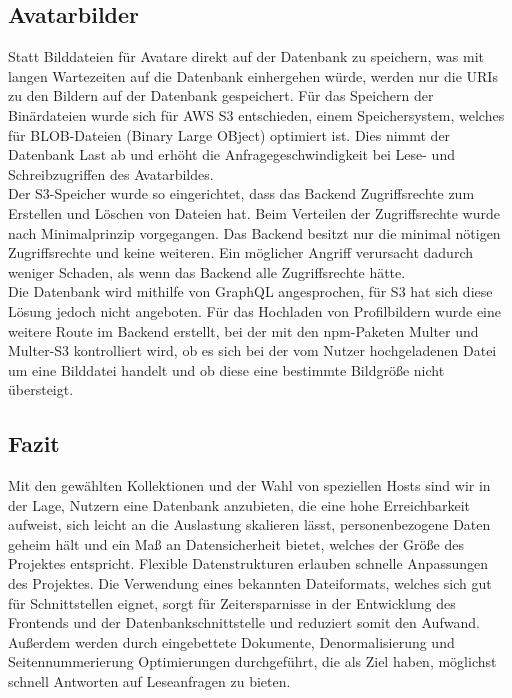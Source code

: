 \subsection{Avatarbilder}
Statt Bilddateien für Avatare direkt auf der Datenbank zu speichern, was mit langen Wartezeiten auf die Datenbank einhergehen würde, werden nur die URIs zu den Bildern auf der Datenbank gespeichert.
Für das Speichern der Binärdateien wurde sich für AWS S3 entschieden, einem Speichersystem, welches für BLOB-Dateien (Binary Large OBject) optimiert ist.
Dies nimmt der Datenbank Last ab und erhöht die Anfragegeschwindigkeit bei Lese- und Schreibzugriffen des Avatarbildes.\\
Der S3-Speicher wurde so eingerichtet, dass das Backend Zugriffsrechte zum Erstellen und Löschen von Dateien hat.
Beim Verteilen der Zugriffsrechte wurde nach Minimalprinzip vorgegangen.
Das Backend besitzt nur die minimal nötigen Zugriffsrechte und keine weiteren.
Ein möglicher Angriff verursacht dadurch weniger Schaden, als wenn das Backend alle Zugriffsrechte hätte.\\
Die Datenbank wird mithilfe von GraphQL angesprochen, für S3 hat sich diese Lösung jedoch nicht angeboten.
Für das Hochladen von Profilbildern wurde eine weitere Route im Backend erstellt, bei der mit den npm-Paketen Multer und Multer-S3 kontrolliert wird, ob es sich bei der vom Nutzer hochgeladenen Datei um eine Bilddatei handelt und ob diese eine bestimmte Bildgröße nicht übersteigt.

\subsection*{Fazit}
Mit den gewählten Kollektionen und der Wahl von speziellen Hosts sind wir in der Lage, Nutzern eine Datenbank anzubieten, die eine hohe Erreichbarkeit aufweist, sich leicht an die Auslastung skalieren lässt, personenbezogene Daten geheim hält und ein Maß an Datensicherheit bietet, welches der Größe des Projektes entspricht.
Flexible Datenstrukturen erlauben schnelle Anpassungen des Projektes.
Die Verwendung eines bekannten Dateiformats, welches sich gut für Schnittstellen eignet, sorgt für Zeitersparnisse in der Entwicklung des Frontends und der Datenbankschnittstelle und reduziert somit den Aufwand.
Außerdem werden durch eingebettete Dokumente, Denormalisierung und Seitennummerierung Optimierungen durchgeführt, die als Ziel haben, möglichst schnell Antworten auf Leseanfragen zu bieten.